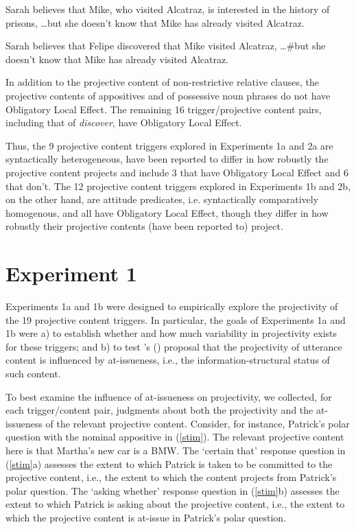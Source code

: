 \documentclass[11pt,fleqn]{article}
\newcommand{\6}{\mbox{$[\hspace*{-.6mm}[$}}
\newcommand{\9}{\mbox{$]\hspace*{-.6mm}]$}}
\newcommand{\citetpos}[1]{\citeauthor{#1}'s (\citeyear{#1})}
\begin{document}
\begin{exe}
\ex\label{ole}
\begin{xlist}
\ex Sarah believes that Mike, who visited Alcatraz, is interested in the history of prisons, \ldots but she doesn't know that Mike has already visited Alcatraz.

\ex Sarah believes that Felipe discovered that Mike visited Alcatraz, \ldots \#but she doesn't know that Mike has already visited Alcatraz. 

\end{xlist}
\end{exe}
In addition to the projective content of non-restrictive relative clauses, the projective contents of appositives and of possessive noun phrases do not have Obligatory Local Effect. The remaining 16 trigger/projective content pairs, including that of {\em discover}, have Obligatory Local Effect. 

Thus, the 9 projective content triggers explored in Experiments 1a and 2a are syntactically heterogeneous, have been reported to differ in how robustly the projective content projects and include 3 that have Obligatory Local Effect and 6 that don't. The 12 projective content triggers explored in Experiments 1b and 2b, on the other hand, are attitude predicates, i.e. syntactically comparatively homogenous, and all have Obligatory Local Effect, though they differ in how robustly their projective contents (have been reported to) project.


\section{Experiment 1}\label{s3}

Experiments 1a and 1b were designed to empirically explore the projectivity of the 19 projective content triggers. In particular, the goals of Experiments 1a and 1b were a) to establish whether and how much variability in projectivity exists for these triggers; and b) to test \citetpos{brst-salt10} proposal that the projectivity of utterance content is influenced by at-issueness, i.e., the information-structural status of such content. 

To best examine the influence of at-issueness on projectivity, we collected, for each trigger/content pair, judgments about both the projectivity and the at-issueness of the relevant projective content. Consider, for instance, Patrick's polar question with the nominal appositive in (\ref{stim}). The relevant projective content here is that Martha's new car is a BMW. The `certain that' response question in (\ref{stim}a) assesses the extent to which Patrick is taken to be committed to the projective content, i.e., the extent to which the content projects from Patrick's polar question. The `asking whether' response question in (\ref{stim}b) assesses the extent to which Patrick is asking about the projective content, i.e., the extent to which the projective content is at-issue in Patrick's polar question. 
\end{document}
